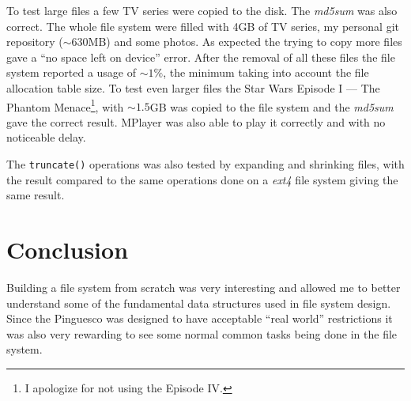 \documentclass{acm_proc_article-sp}
\newcommand{\pfs}{Pinguesco\xspace}
\begin{document}
To test large files a few TV series were copied to the disk. 
The \emph{md5sum} was also correct. The whole file system were filled
with 4GB of TV series, my personal git repository ($\sim630$MB) and
some photos. As expected the trying to copy more files gave a 
``no space left on device'' error. After the removal of all these files
the file system reported a usage of $\sim1\%$, the minimum taking into account
the file allocation table size. To test even larger files the
Star Wars Episode I --- The Phantom Menace\footnote{I apologize for not 
  using the Episode IV.}, with $\sim1.5$GB was copied to
the file system and the \emph{md5sum} gave the correct result. 
MPlayer was also able to play it correctly and with no noticeable delay.

The \verb|truncate()| operations was also tested by expanding
and shrinking files, with the result compared to the same operations done
on a \emph{ext4} file system giving the same result.


\section{Conclusion}
Building a file system from scratch was very interesting and allowed me
to better understand some of the fundamental data structures used in
file system design. Since the \pfs was designed to have acceptable
``real world'' restrictions it was also very rewarding to see some
normal common tasks being done in the file system.



\end{document}
